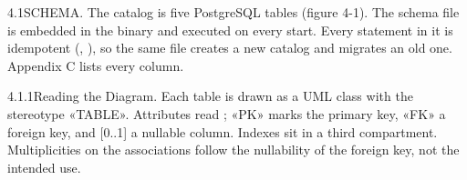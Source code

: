 \documentclass[handbook]{nasa-handbook}
\begin{document}

\begin{nhpara}{4.1}{SCHEMA.}
The catalog is five PostgreSQL tables (figure 4-1). The schema file is embedded in the binary and executed on every start. Every statement in it is idempotent (, ), so the same file creates a new catalog and migrates an old one. Appendix C lists every column.
\end{nhpara}

\begin{nhsubpara}{4.1.1}{Reading the Diagram.}
Each table is drawn as a UML class with the stereotype «TABLE». Attributes read ; «PK» marks the primary key, «FK» a foreign key, and [0..1] a nullable column. Indexes sit in a third compartment. Multiplicities on the associations follow the nullability of the foreign key, not the intended use.
\end{nhsubpara}
\end{document}

